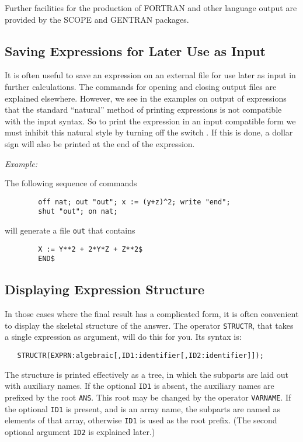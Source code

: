 Further facilities for the production of FORTRAN and other language output
are provided by the SCOPE and GENTRAN
packages.

\subsection{Saving Expressions for Later Use as Input}
\hypertarget{switch:NAT}{}

It is often useful to save an expression on an external file for use later
as input in further calculations. The commands for opening and closing
output files are explained elsewhere. However, we see in the examples on
output of expressions that the standard ``natural'' method of printing
expressions is not compatible with the input syntax. So to print the
expression in an input compatible form we must inhibit this natural style
by turning off the switch . If this is done, a
dollar sign will also be printed at the end of the expression.

\textit{Example:}

The following sequence of commands
\begin{verbatim}
        off nat; out "out"; x := (y+z)^2; write "end";
        shut "out"; on nat;
\end{verbatim}
will generate a file \texttt{out} that contains
\begin{verbatim}
        X := Y**2 + 2*Y*Z + Z**2$
        END$
\end{verbatim}

\subsection{Displaying Expression Structure}
\hypertarget{operator:STRUCTR}{}

In those cases where the final result has a complicated form, it is often
convenient to display the skeletal structure of the answer.  The operator
\texttt{STRUCTR}, that takes a single expression as argument,
will do this for you.  Its syntax is:
\begin{verbatim}
   STRUCTR(EXPRN:algebraic[,ID1:identifier[,ID2:identifier]]);
\end{verbatim}
The structure is printed effectively as a tree, in which the subparts are
laid out with auxiliary names.  If the optional \texttt{ID1} is absent, the
auxiliary names are prefixed by the root \texttt{ANS}.  This root may be
changed by the operator \texttt{VARNAME}.  If the
optional \texttt{ID1} is present, and is an array name, the subparts are
named as elements of that array, otherwise \texttt{ID1} is used as the root
prefix. (The second optional argument \texttt{ID2} is explained later.)

